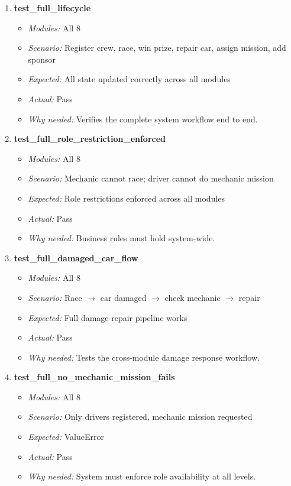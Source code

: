 \documentclass{article}
\begin{document}
\begin{enumerate}[resume, label=\textbf{TC\arabic*.}]

\item \textbf{test\_full\_lifecycle}
\begin{itemize}[noitemsep]
  \item \textit{Modules:} All 8
  \item \textit{Scenario:} Register crew, race, win prize, repair car, assign mission, add sponsor
  \item \textit{Expected:} All state updated correctly across all modules
  \item \textit{Actual:} Pass
  \item \textit{Why needed:} Verifies the complete system workflow end to end.
\end{itemize}

\item \textbf{test\_full\_role\_restriction\_enforced}
\begin{itemize}[noitemsep]
  \item \textit{Modules:} All 8
  \item \textit{Scenario:} Mechanic cannot race; driver cannot do mechanic mission
  \item \textit{Expected:} Role restrictions enforced across all modules
  \item \textit{Actual:} Pass
  \item \textit{Why needed:} Business rules must hold system-wide.
\end{itemize}

\item \textbf{test\_full\_damaged\_car\_flow}
\begin{itemize}[noitemsep]
  \item \textit{Modules:} All 8
  \item \textit{Scenario:} Race $\to$ car damaged $\to$ check mechanic $\to$ repair
  \item \textit{Expected:} Full damage-repair pipeline works
  \item \textit{Actual:} Pass
  \item \textit{Why needed:} Tests the cross-module damage response workflow.
\end{itemize}

\item \textbf{test\_full\_no\_mechanic\_mission\_fails}
\begin{itemize}[noitemsep]
  \item \textit{Modules:} All 8
  \item \textit{Scenario:} Only drivers registered, mechanic mission requested
  \item \textit{Expected:} ValueError
  \item \textit{Actual:} Pass
  \item \textit{Why needed:} System must enforce role availability at all levels.
\end{itemize}


\end{enumerate}
\end{document}
